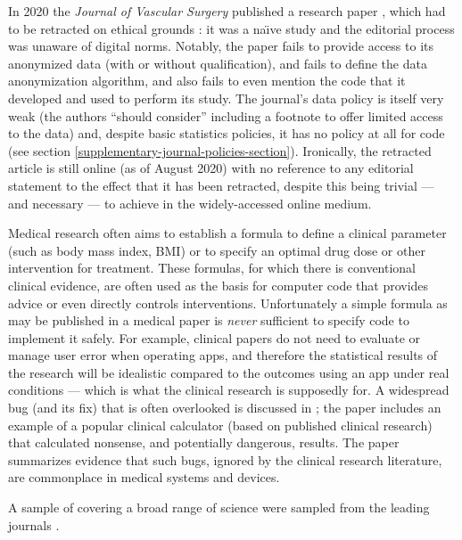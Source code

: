 \documentclass[10pt,a4paper]{article}
\begin{document}
In 2020 the \emph{Journal of Vascular Surgery\/} published a research paper \cite{jvs1}, which had to be retracted on ethical grounds \cite{jvs2,jvs3}: it was a na\"\i ve study and the editorial process was unaware of digital norms. Notably, the paper fails to provide access to its anonymized data (with or without qualification), and fails to define the data anonymization algorithm, and also fails to even mention the code that it developed and used to perform its study. The journal's data policy is itself very weak (the authors ``should consider'' including a footnote to offer limited access to the data) and, despite basic statistics policies, it has no policy at all for code (see  section \ref{supplementary-journal-policies-section}). Ironically, the retracted article \cite{jvs1} is still online (as of August 2020) with no reference to any editorial statement to the effect that it has been retracted, despite this being trivial --- and necessary --- to achieve in the widely-accessed online medium.

Medical research often aims to establish a formula to define a clinical parameter (such as body mass index, BMI) or to specify an optimal drug dose or other intervention for treatment. These formulas, for which there is conventional clinical evidence, are often used as the basis for computer code that provides advice or even directly controls interventions. Unfortunately a simple formula as may be published in a medical paper is \emph{never\/} sufficient to specify code to implement it safely. For example, clinical papers do not need to evaluate or manage user error when operating apps, and therefore the statistical results of the research will be idealistic compared to the outcomes using an app under real conditions --- which is what the clinical research is supposedly for. A widespread bug (and its fix) that is often overlooked is discussed in \cite{numerals}; the paper includes an example of a popular clinical calculator (based on published clinical research) that calculated nonsense, and potentially dangerous, results. The paper \cite{fda} summarizes evidence that such bugs, ignored by the clinical research literature, are commonplace in medical systems and devices.

A sample of  covering a broad range of science were sampled from the leading journals \journalBreakdown. 

\makeatletter
\long{}
\makeatother
\end{document}
